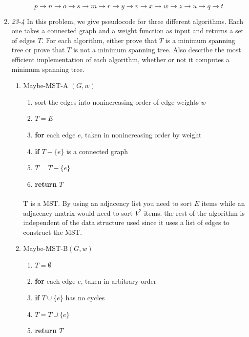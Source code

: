 \documentclass[]{memoir}
\begin{document}
\begin{enumerate}
\paragraph{}
$$p \to n \to o \to s \to m \to r \to y \to v \to x \to w \to z \to u \to q \to t$$
\pagebreak
\item \textit{23-4} In this problem, we give pseudocode for three different algorithms. Each one takes a connected graph and a weight function as input and returns a set of edges $T$. For each algorithm, either prove that $T$ is a minimum spanning tree or prove that $T$ is not a minimum spanning tree. Also describe the most efficient implementation of each algorithm, whether or not it computes a minimum spanning tree.
\begin{enumerate}
\item Maybe-MST-A $(G,w)$ 
\begin{enumerate}[label=\arabic*\hspace{2mm}]
\item sort the edges into nonincreasing order of edge weights $w$
\item $T = E$
\item \textbf{for} each edge $e$, taken in nonincreasing order by weight
\item \hspace{1cm} \textbf{if} $T-\{e\}$ is a connected graph
\item \hspace{2cm}$T=T-\{e\}$
\item \textbf{return} $T$
\end{enumerate}
\paragraph{}
T is a MST. By using an adjacency list you need to sort $E$ items while an adjacency matrix would need to sort $V^{2}$ items. the rest of the algorithm is independent of the data structure used since it uses a list of edges to construct the MST.
\item Maybe-MST-B$(G,w)$
\begin{enumerate}[label=\arabic*\hspace{2mm}]
\item $T=\emptyset$
\item \textbf{for} each edge $e$, taken in arbitrary order
\item \hspace{1cm}\textbf{if} $T\cup\{e\}$ has no cycles
\item \hspace{2cm}$T=T\cup\{e\}$
\item \textbf{return} $T$
\end{enumerate}

\end{enumerate}
\end{enumerate}
\end{document}
